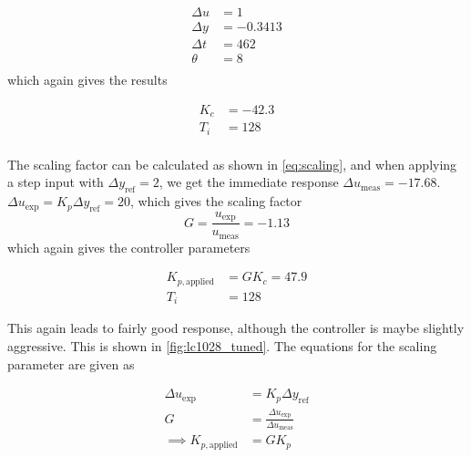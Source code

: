 \begin{equation}
	\begin{aligned}
		\Delta u &= 1\\
		\Delta y &= -0.3413\\
		\Delta t &= 462 \\
		\theta &= 8\\
	\end{aligned}
\end{equation}
which again gives the results

\begin{equation}
	\begin{aligned}
		K_c &= -42.3\\
		T_i &= 128\\
	\end{aligned}
\end{equation}

The scaling factor can be calculated as shown in \eqref{eq:scaling}, and when applying a step input with $\Delta y_{\text{ref}} = 2$, we get the immediate response $\Delta u_{\text{meas}} = -17.68$. $\Delta u_\text{exp} = K_p\Delta y_{\text{ref}} = 20$, which gives the scaling factor
\begin{equation}
	G = \frac{u_{\text{exp}}}{u_{\text{meas}}} = -1.13
\end{equation}
which again gives the controller parameters

\begin{equation}
	\begin{aligned}
		K_{p,\text{applied}} &= GK_c = 47.9\\
		T_i &= 128
	\end{aligned}
\end{equation}

This again leads to fairly good response, although the controller is maybe slightly aggressive. This is shown in \autoref{fig:lc1028_tuned}. The equations for the scaling parameter are given as

\begin{equation}\label{eq:scaling}
	\begin{aligned}
		\Delta u_{\text{exp}} &= K_p \Delta y_{\text{ref}} \\
		G &= \frac{\Delta u_{\text{exp}}}{\Delta u_{\text{meas}}} \\
		\implies K_{p,\text{applied}} &= GK_p
	\end{aligned}
\end{equation}


